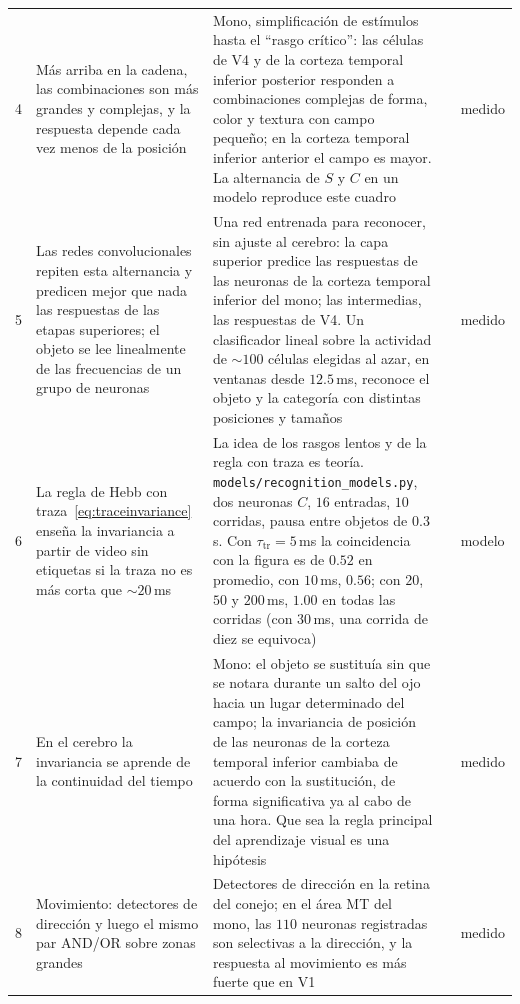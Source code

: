 {\begin{longtable}{>{\raggedright}p{0.5cm}>{\raggedright}p{4.0cm}>{\raggedright}p{5.6cm}>{\raggedright}p{2.3cm}>{\raggedright\arraybackslash}p{1.7cm}}
4 & Más arriba en la cadena, las combinaciones son más grandes y complejas, y la respuesta depende cada vez menos de la posición & Mono, simplificación de estímulos hasta el “rasgo crítico”: las células de V4 y de la corteza temporal inferior posterior responden a combinaciones complejas de forma, color y textura con campo pequeño; en la corteza temporal inferior anterior el campo es mayor. La alternancia de $S$ y $C$ en un modelo reproduce este cuadro & \cite{KobatakeTanaka1994,Riesenhuber1999} & medido \\
5 & Las redes convolucionales repiten esta alternancia y predicen mejor que nada las respuestas de las etapas superiores; el objeto se lee linealmente de las frecuencias de un grupo de neuronas & Una red entrenada para reconocer, sin ajuste al cerebro: la capa superior predice las respuestas de las neuronas de la corteza temporal inferior del mono; las intermedias, las respuestas de V4. Un clasificador lineal sobre la actividad de $\sim100$ células elegidas al azar, en ventanas desde $12.5$\,ms, reconoce el objeto y la categoría con distintas posiciones y tamaños & \cite{Fukushima1980,Yamins2014,Hung2005} & medido \\
6 & La regla de Hebb con traza~\eqref{eq:traceinvariance} enseña la invariancia a partir de video sin etiquetas si la traza no es más corta que $\sim20$\,ms & La idea de los rasgos lentos y de la regla con traza es teoría. \texttt{models/\allowbreak recognition\_models.py}, dos neuronas $C$, $16$ entradas, $10$ corridas, pausa entre objetos de $0.3$\,s. Con $\tau_{\text{tr}}=5$\,ms la coincidencia con la figura es de $0.52$ en promedio, con $10$\,ms, $0.56$; con $20$, $50$ y $200$\,ms, $1.00$ en todas las corridas (con $30$\,ms, una corrida de diez se equivoca) & \cite{Foldiak1991,WiskottSejnowski2002} & modelo \\
7 & En el cerebro la invariancia se aprende de la continuidad del tiempo & Mono: el objeto se sustituía sin que se notara durante un salto del ojo hacia un lugar determinado del campo; la invariancia de posición de las neuronas de la corteza temporal inferior cambiaba de acuerdo con la sustitución, de forma significativa ya al cabo de una hora. Que sea la regla principal del aprendizaje visual es una hipótesis & \cite{LiDiCarlo2008} & medido \\
8 & Movimiento: detectores de dirección y luego el mismo par AND/OR sobre zonas grandes & Detectores de dirección en la retina del conejo; en el área MT del mono, las $110$ neuronas registradas son selectivas a la dirección, y la respuesta al movimiento es más fuerte que en V1 & \cite{Barlow1965,Albright1984} & medido \\

\end{longtable}}
